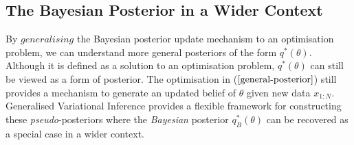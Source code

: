 \documentclass[twoside,11pt]{article}
\newcommand{\jw}[1]{{\color{gray} [JW: #1]}}
\begin{document}
\subsection{The Bayesian Posterior in a Wider Context}
By $\textit{generalising}$ the Bayesian posterior update mechanism to an optimisation problem, we can understand more general posteriors of the form $q^*(\theta)$. Although it is defined as a solution to an optimisation problem, $q^*(\theta)$ can still be viewed as a form of posterior. The optimisation in ($\ref{general-posterior}$) still provides a mechanism to generate an updated belief of $\theta$ given new data $x_{1:N}$. Generalised Variational Inference provides a flexible framework for constructing these \textit{pseudo}-posteriors where the \textit{Bayesian} posterior $q_B^*(\theta)$ can be recovered as a special case in a wider context.



\end{document}
